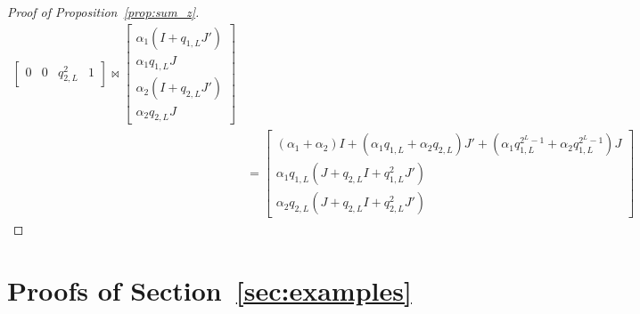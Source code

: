 \documentclass[a4paper]{article}
\newcommand{\LL}{L}
\begin{document}
\begin{proof}[Proof of Proposition~\ref{prop:sum_z}]
\[\begin{split}
\begin{bmatrix}
        0 & 0 & q_{2,\LL}^2 & 1
    \end{bmatrix}
    \Join
    \begin{bmatrix}
        \alpha_1 \left(I + q_{1,\LL}J' \right) \\
        \alpha_1 q_{1,\LL} J \\
        \alpha_2 \left(I + q_{2,\LL}J' \right) \\
        \alpha_2 q_{2,\LL} J 
    \end{bmatrix}
    \\
    &= 
    \begin{bmatrix}
        (\alpha_1 + \alpha_2) I + (\alpha_1 q_{1,\LL} + \alpha_2 q_{2,\LL}) J' + (\alpha_1 q_{1,\LL}^{2^{\LL}-1}+ \alpha_2 q_{1,\LL}^{2^{\LL}-1}) J \\
        \alpha_1 q_{1,\LL} \left(J + q_{2,\LL}I + q_{1,\LL}^2 J' \right)\\
        \alpha_2 q_{2,\LL} \left(J + q_{2,\LL}I + q_{2,\LL}^2 J' \right)
    \end{bmatrix}
\end{split}
\]
\end{proof}




\section{Proofs of Section~\ref{sec:examples}} \label{app:examples}
\end{document}
